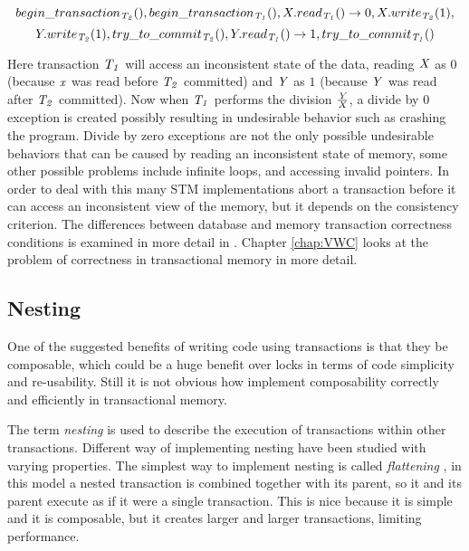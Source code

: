 $$begin\_transaction_{\ms{T_2}}(), begin\_transaction_{\ms{T_1}}(), X.read_{\ms{T_1}}() \to 0, X.write_{\ms{T_2}}(1),$$
$$ Y.write_{\ms{T_2}}(1), try\_to\_commit_{\ms{T_2}}(), Y.read_{\ms{T_1}}() \to 1, try\_to\_commit_{\ms{T_1}}()$$

Here transaction $\ms{T_1}$ will access an inconsistent state of the data, reading $\ms{X}$ as
$0$ (because $\ms{x}$ was read before $\ms{T_2}$ committed) and $\ms{Y}$ as $1$ (because $\ms{Y}$ was read after $\ms{T_2}$ committed).
Now when $\ms{T_1}$ performs the division
$\frac{\ms{Y}}{\ms{X}}$, a divide by $0$ exception is created possibly resulting in undesirable
 behavior such as crashing the program.
Divide by zero exceptions are not the only possible undesirable behaviors that can
 be caused by reading an inconsistent state of memory, some other possible problems include 
infinite loops, and accessing invalid pointers.
In order to deal with this many STM implementations abort a transaction before it
 can access an inconsistent view of the memory, but it depends on the consistency criterion.
The differences between database and memory transaction correctness conditions is examined in more detail in \cite{AH12}.
Chapter \ref{chap:VWC} looks at the problem of correctness in transactional memory in more detail.


\subsection{Nesting}
One of the suggested benefits of writing code using transactions is that they be composable,
 which could be a huge benefit over locks in terms of code simplicity and re-usability.
Still it is not obvious how implement composability correctly and efficiently in transactional memory.

The term \emph{nesting} is used to describe the execution of transactions within other transactions.
Different way of implementing nesting have been studied with varying properties.
The simplest way to implement nesting is called \emph{flattening} \cite{ALS06},
in this model a nested
 transaction is combined together with its parent, so it and its parent execute as if it were a single transaction.
This is nice because it is simple and it is composable, but it creates larger and larger transactions, limiting performance.

